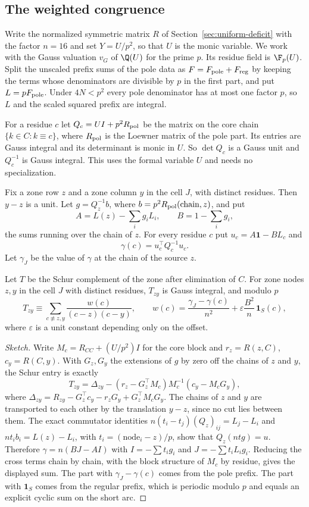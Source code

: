 \subsection{The weighted congruence}
Write the normalized symmetric matrix $R$ of Section~\ref{sec:uniform-deficit} with the factor $n=16$ and set $Y=U/p^2$, so that $U$ is the monic variable. We work with
the Gauss valuation $v_G$ of $\Q(U)$ for the prime $p$. Its residue field is $\F_p(U)$.
Split the unscaled prefix sums of the pole data as $F=F_{\rm pole}+F_{\rm reg}$ by keeping the terms whose denominators are divisible by $p$ in the first part, and put $L=pF_{\rm pole}$.
Under $4N<p^2$ every pole denominator has at most one factor $p$, so $L$ and the scaled squared prefix are integral.

For a residue $c$ let $Q_c=UI+p^2R_{\rm pol}$ be the matrix on the core chain $\{k\in C:k\equiv c\}$, where $R_{\rm pol}$ is the Loewner matrix of the pole part. Its entries are Gauss integral
and its determinant is monic in $U$. So $\det Q_c$ is a Gauss unit and $Q_c^{-1}$ is Gauss integral. This uses the formal variable $U$ and needs no specialization.

Fix a zone row $z$ and a zone column $y$ in the cell $J$, with distinct residues. Then $y-z$ is a unit. Let $g=Q_z^{-1}b$, where $b=p^2R_{\rm pol}(\text{chain},z)$, and put
\[
 A=L(z)-\sum_ig_iL_i,\qquad B=1-\sum_ig_i ,
\]
the sums running over the chain of $z$. For every residue $c$ put $u_c=A\mathbf 1-BL_c$ and
\[
 \gamma(c)=u_c^{\top}Q_c^{-1}u_c .
\]
Let $\gamma_J$ be the value of $\gamma$ at the chain of the source $z$.

\begin{proposition}\label{prop:weighted}
Let $T$ be the Schur complement of the zone after elimination of $C$. For zone nodes $z,y$ in the cell $J$ with distinct residues, $T_{zy}$ is Gauss integral, and modulo $p$
\[
 T_{zy}\equiv\sum_{c\not\equiv z,y}\frac{w(c)}{(c-z)(c-y)},\qquad
 w(c)=\frac{\gamma_J-\gamma(c)}{n^2}+\varepsilon\frac{B^2}{n}\,\mathbf 1_S(c),
\]
where $\varepsilon$ is a unit constant depending only on the offset.
\end{proposition}

\begin{proof}[Sketch]
Write $M_c=R_{CC}+(U/p^2)I$ for the core block and $r_z=R(z,C)$, $c_y=R(C,y)$. With $G_z,G_y$ the extensions of $g$ by zero off the chains of $z$ and $y$, the Schur entry is exactly
\[
 T_{zy}=\Delta_{zy}-(r_z-G_z^{\top}M_c)M_c^{-1}(c_y-M_cG_y),
\]
where $\Delta_{zy}=R_{zy}-G_z^{\top}c_y-r_zG_y+G_z^{\top}M_cG_y$. The chains of $z$ and $y$ are transported to each other by the translation $y-z$, since no cut lies between them.
The exact commutator identities
$n(t_i-t_j)(Q_z)_{ij}=L_j-L_i$ and $nt_ib_i=L(z)-L_i$, with $t_i=(\text{node}_i-z)/p$, show that $Q_z(ntg)=u$. Therefore $\gamma=n(BJ-AI)$ with $I=-\sum t_ig_i$ and $J=-\sum t_iL_ig_i$.
Reducing the cross terms chain by chain, with the block structure of $M_c$ by residue, gives the displayed sum. The part with $\gamma_J-\gamma(c)$ comes from the pole prefix.
The part with $\mathbf 1_S$ comes from the regular prefix, which is periodic modulo $p$ and equals an explicit cyclic sum on the short arc.
\end{proof}

